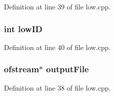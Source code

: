 Definition at line 39 of file low.cpp.
\subsubsection{\setlength{\rightskip}{0pt plus 5cm}int {\bf low\-ID}}\label{low_8cpp_a2}




Definition at line 40 of file low.cpp.
\subsubsection{\setlength{\rightskip}{0pt plus 5cm}ofstream$\ast$ {\bf output\-File}}\label{low_8cpp_a0}




Definition at line 38 of file low.cpp.